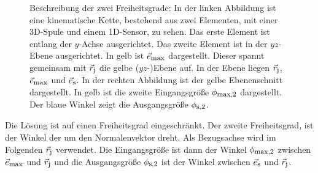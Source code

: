 	\begin{figure}[h!]
		\centering
		\caption{ Beschreibung der zwei Freiheitsgrade: In der linken Abbildung ist eine kinematische Kette, bestehend aus zwei Elementen, mit einer 3D-Spule und einem 1D-Sensor, zu sehen. Das erste Element ist entlang der $y$-Achse ausgerichtet. Das zweite Element ist in der $yz$-Ebene ausgerichtet. In gelb ist $\vec{e}_{\textrm{\footnotesize{max}}}$ dargestellt. Dieser spannt gemeinsam mit $\vec{r}_{\textrm{\footnotesize{j}}}$ die gelbe ($yz$-)Ebene  auf. In der Ebene liegen $\vec{r}_{\textrm{\footnotesize{j}}}$, $\vec{e}_{\textrm{\footnotesize{max}}}$ und $\vec{e}_{\textrm{\footnotesize{s}}}$. In der rechten Abbildung ist der gelbe Ebenenschnitt dargestellt. In gelb ist die zweite Eingangsgröße $\phi_{\textrm{\footnotesize{max,2}}}$ dargestellt. Der blaue Winkel zeigt die Ausgangsgröße $\phi_{\textrm{\footnotesize{s,2}}}$.}
		\label{fig:Visualisierung_Uniqueness_Ebene}
	\end{figure}
Die Lösung ist auf einen Freiheitsgrad eingeschränkt. Der zweite Freiheitsgrad, ist der Winkel der um den Normalenvektor dreht. Als Bezugsachse wird im Folgenden $\vec{r}_{\textrm{\footnotesize{j}}}$ verwendet. Die Eingangsgröße ist dann der Winkel $\phi_{\textrm{\footnotesize{max,2}}}$ zwischen $\vec{e}_{\textrm{\footnotesize{max}}}$ und $\vec{r}_{\textrm{\footnotesize{j}}}$ und die Ausgangsgröße $\phi_{\textrm{\footnotesize{s,2}}}$ ist der Winkel zwischen $\vec{e}_{\textrm{\footnotesize{s}}}$ und $\vec{r}_{\textrm{\footnotesize{j}}}$.

